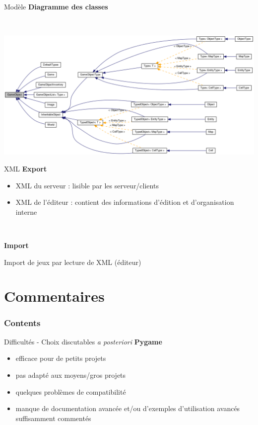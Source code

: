 \documentclass[11pt]{beamer}
\begin{document}
\begin{frame}{Modèle}
	\textbf{Diagramme des classes}
	
	~
	
	\begin{center}
		\includegraphics[scale=.24]{GameObject.png}
	\end{center}
\end{frame}


\begin{frame}{XML}
	\textbf{Export}
	\begin{itemize}
		\item XML du serveur : lisible par les serveur/clients
		\item XML de l'éditeur : contient des informations d'édition et d'organisation interne
	\end{itemize}
	
	~
	
	\textbf{Import}
	
	Import de jeux par lecture de XML (éditeur)
\end{frame}


\section{Commentaires}

    \begin{frame}
        \frametitle{Contents}
        \tableofcontents[currentsection]
    \end{frame}
    
\begin{frame}{Difficultés - Choix discutables \textit{a posteriori}}
	\textbf{Pygame}
	\begin{itemize}
		\item efficace pour de petits projets
		\item pas adapté aux moyens/gros projets
		\item quelques problèmes de compatibilité
		\item manque de documentation avancée et/ou d'exemples d'utilisation avancés suffisamment commentés
	\end{itemize}
\end{frame}
\end{document}
